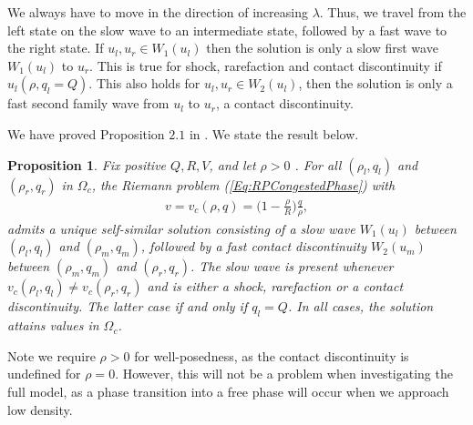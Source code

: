 \documentclass[10pt]{article}
\newtheorem{proposition}{Proposition}[theorem]
\numberwithin{equation}{section}
\begin{document}
We always have to move in the direction of increasing $\lambda$. Thus, we travel from the left state on the slow wave to an intermediate state, followed by a fast wave to the right state. If $u_l, u_r \in W_1(u_l)$ then the solution is only a slow first wave $W_1(u_l)$ to $u_r$. This is true for shock, rarefaction and contact discontinuity if $u_l(\rho, q_l = Q)$. This also holds for $u_l, u_r \in W_2(u_l)$, then the solution is only a fast second family wave from $u_l$ to $u_r$, a contact discontinuity. 

We have proved Proposition $2.1$ in \cite{Colombo2002}. We state the result below.

\begin{proposition}
Fix positive $Q, R, V$, and let $\rho > 0$ . For all $(\rho_l, q_l)$ and $(\rho_r, q_r)$ in $\Omega_c$, the Riemann problem (\ref{Eq:RPCongestedPhase}) with \begin{align*}
    v = v_c(\rho,q) = \big(1 - \frac{\rho}{R}\big)\frac{q}{\rho},
\end{align*} admits a unique self-similar solution consisting of a slow wave $W_1(u_l)$ between  $(\rho_l, q_l)$ and  $(\rho_m, q_m)$, followed by a fast contact discontinuity  $W_2(u_m)$ between  $(\rho_m, q_m)$ and  $(\rho_r, q_r)$. The slow wave is present whenever $v_c(\rho_l, q_l) \neq v_c(\rho_r, q_r)$ and is either a shock, rarefaction or a contact discontinuity. The latter case if and only if $q_l = Q$. In all cases, the solution attains values in $\Omega_c$.
\end{proposition}
Note we require $\rho > 0$ for well-posedness, as the contact discontinuity is undefined for $\rho = 0$. However, this will not be a problem when investigating the full model, as a phase transition into a free phase will occur when we approach low density. 

\begin{figure} \centering
    
\end{figure}
\end{document}

